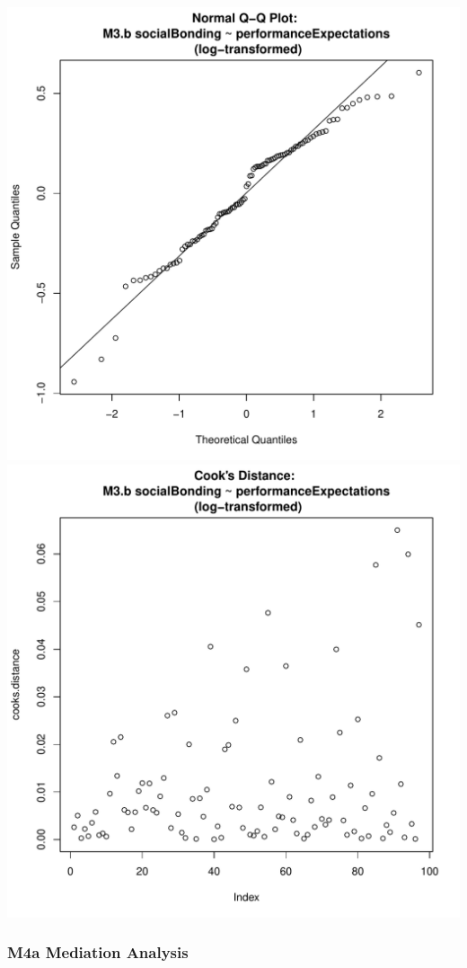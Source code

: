 \documentclass[12pt]{report}
\begin{document}
\includegraphics[scale =.4]{../images/MLM3bLogQQNorm.pdf}
\includegraphics[scale =.4]{../images/MLM3bLogCooksD.pdf}


\newpage
\subsubsection{M4a Mediation Analysis}
\end{document}
